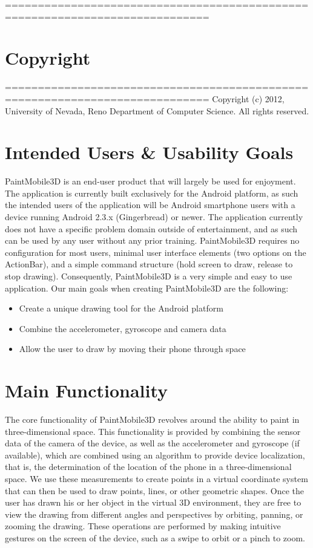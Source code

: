 \documentclass{chi-ext}
\begin{document}
\pagebreak

%
=============================================================================
\section{Copyright} %
=============================================================================
Copyright (c) 2012, University of Nevada, Reno Department of Computer Science.
All rights reserved.

\section{Intended Users \& Usability Goals}

PaintMobile3D is an end-user product that will largely be used for enjoyment.
The application is currently built exclusively for the Android platform, as
such the intended users of the application will be Android smartphone users
with a device running Android 2.3.x (Gingerbread) or newer. The application
currently does not have a specific problem domain outside of entertainment,
and as such can be used by any user without any prior training. PaintMobile3D
requires no configuration for most users, minimal user interface elements (two
options on the ActionBar), and a simple command structure (hold screen to
draw, release to stop drawing). Consequently, PaintMobile3D is a very simple
and easy to use application. Our main goals when creating PaintMobile3D are
the following:

\begin{itemize} \item Create a unique drawing tool for the Android platform
\item Combine the accelerometer, gyroscope and camera data \item Allow the
user to draw by moving their phone through space \end{itemize}

\section{Main Functionality}

The core functionality of PaintMobile3D revolves around the ability to paint
in three-dimensional space. This functionality is provided by combining the
sensor data of the camera of the device, as well as the accelerometer and
gyroscope (if available), which are combined using an algorithm to provide
device localization, that is, the determination of the location of the phone
in a three-dimensional space. We use these measurements to create points in a
virtual coordinate system that can then be used to draw points, lines, or
other geometric shapes. Once the user has drawn his or her object in the
virtual 3D environment, they are free to view the drawing from different
angles and perspectives by orbiting, panning, or zooming the drawing. These
operations are performed by making intuitive gestures on the screen of the
device, such as a swipe to orbit or a pinch to zoom.
\end{document}
